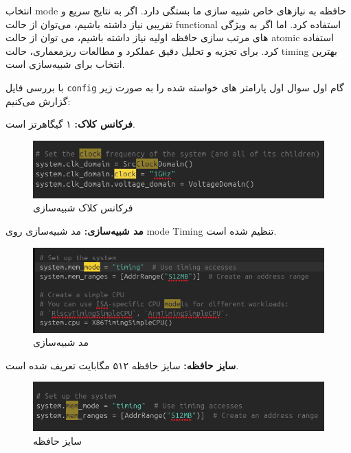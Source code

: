\documentclass[12pt]{exam}
\begin{document}
\begin{multicols}{1}
\begin{enumerate}
	\end{enumerate}
	
	انتخاب mode حافظه به نیازهای خاص شبیه سازی ما بستگی دارد. اگر به نتایج سریع و تقریبی نیاز داشته باشیم، می‌توان از حالت functional استفاده کرد. اما اگر به ویژگی های مرتب سازی حافظه اولیه نیاز داشته باشیم، می توان از حالت atomic استفاده کرد. برای تجزیه و تحلیل دقیق عملکرد و مطالعات ریزمعماری، حالت timing بهترین انتخاب برای شبیه‌سازی است.
	
	
	
	
	با بررسی فایل \texttt{config} گام اول سوال اول پارامتر های خواسته شده را به صورت زیر گزارش می‌کنیم:
	
	\textbf{فرکانس کلاک: } ۱ گیگا‌هرتز است.
	
	\begin{center}
		\begin{figure}[H]
			\includegraphics[scale=0.36]{images/img13.png}
			\caption{فرکانس کلاک شبیه‌سازی}
			\label{فرکانس کلاک}
		\end{figure}
	\end{center}
	
	\textbf{مد شبیه‌سازی: }مد شبیه‌سازی روی mode Timing تنظیم شده است.
	\begin{center}
		\begin{figure}[H]
			\includegraphics[scale=0.33]{images/img11.png}
			\caption{مد شبیه‌سازی}
			\label{مد شبیه‌سازی}
		\end{figure}
	\end{center}
	
	\textbf{سایز حافظه: }سایز حافظه ۵۱۲ مگابایت تعریف شده است.
	\begin{center}
		\begin{figure}[H]
			\includegraphics[scale=0.35]{images/img12.png}
			\caption{سایز حافظه}
			\label{سایز حافظه}
		\end{figure}
	\end{center}
	
	
	
	
	

		
\end{multicols}
\end{document}
